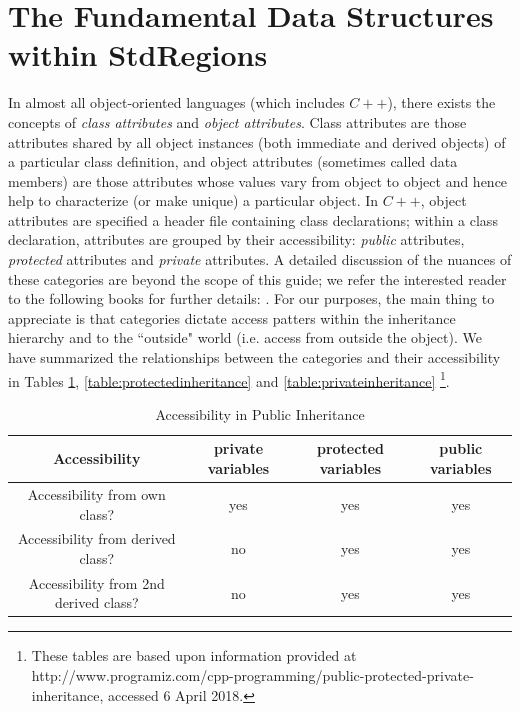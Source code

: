 %
\section{The Fundamental Data Structures within StdRegions}
\label{sec:stdregions-datastructures}

In almost all object-oriented languages (which includes $C++$), there exists the concepts of {\em class attributes} and {\em object attributes}.  Class attributes are those attributes shared by all object instances (both immediate and derived objects) of a particular class definition, and object attributes (sometimes called data members) are those attributes whose values vary from object to object and hence help to characterize (or make unique) a particular object. In $C++$, object attributes are specified a header file containing class declarations; within a class declaration, attributes are grouped by their accessibility: {\em public} attributes, {\em protected} attributes and {\em private} attributes.  A detailed discussion of the nuances of these
categories are beyond the scope of this guide; we refer the interested reader to the following books for further details:  \cite{BStroustrup,SMeyers}.
For our purposes, the main thing to appreciate is that categories dictate access patters within the inheritance hierarchy and to the ``outside" world 
(i.e. access from outside the object).  We have summarized the relationships between the categories and their accessibility in Tables
\ref{table:publicinheritance}, \ref{table:protectedinheritance} and \ref{table:privateinheritance} \footnote{These tables are based upon information provided at http://www.programiz.com/cpp-programming/public-protected-private-inheritance, accessed 6 April 2018.}.


\begin{table}[ht]
\begin{center}
\caption{Accessibility in Public Inheritance}
\begin{tabular}{c c c c}
\hline\hline
Accessibility & private variables & protected variables & public variables \\
\hline
Accessibility from own class? & yes & yes & yes \\
Accessibility from derived class? & no & yes & yes\\
Accessibility from 2nd derived class? & no & yes & yes\\
\end{tabular}
\end{center}
\label{table:publicinheritance}
\end{table}

